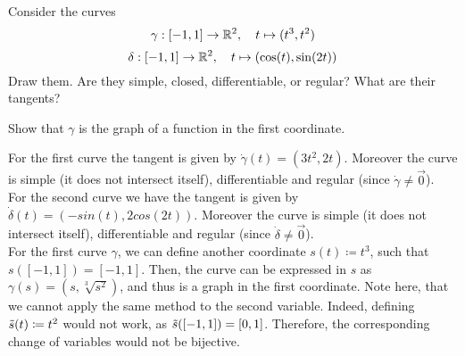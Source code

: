 \documentclass[11pt]{article}
\begin{document}
\begin{exercise}
    Consider the curves 
    \[
        \gamma : [-1,1] \rightarrow \mathbb{R}^2, \quad t \mapsto ( t^3, t^2 )
    \]
    \[
        \delta : [-1,1] \rightarrow \mathbb{R}^2, \quad t \mapsto ( \cos(t), \sin(2t) )
    \]
    Draw them. Are they simple, closed, differentiable, or regular? What are their tangents?
    
    Show that $\gamma$ is the graph of a function in the first coordinate.
\end{exercise}
\begin{solution}    
    For the first curve the tangent is given by $\dot{\gamma}(t) = ( 3t^2, 2t )$.
    Moreover the curve is simple (it does not intersect itself), differentiable and regular (since $\dot{\gamma} \neq \vec{0}$).
    \\

    For the second curve we have the tangent is given by $\dot{\delta}(t) = (-sin(t),2cos(2t))$.
    Moreover the curve is simple (it does not intersect itself), differentiable and regular (since $\dot{\delta} \neq \vec{0}$).\\

    For the first curve $\gamma$, we can define another coordinate $s(t) \coloneqq t^3$, such that $s([-1, 1]) = [-1, 1]$.
    Then, the curve can be expressed in $s$ as $\gamma(s) = (s, \sqrt[3]{s^2})$, and thus is a graph in the first coordinate. Note here, that we cannot apply the same method to the second variable.
    Indeed, defining $\Tilde{s}(t) \coloneqq t^2$ would not work, as $\Tilde{s}([-1, 1]) = [0, 1]$. Therefore, the corresponding change of variables would not be bijective.
\end{solution}
\end{document}
